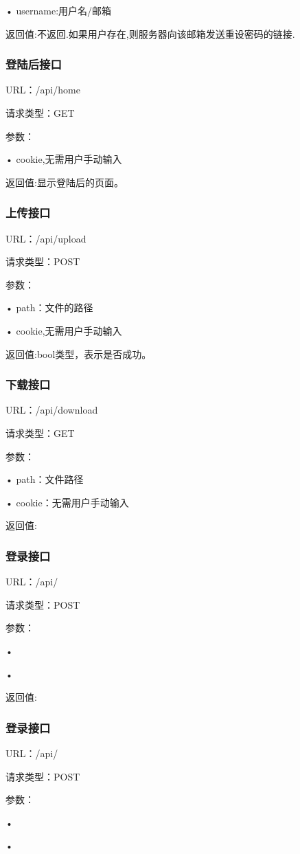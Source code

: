• username:用户名/邮箱

返回值:不返回.如果用户存在,则服务器向该邮箱发送重设密码的链接.

\subsubsection{登陆后接口}
URL：/api/home

请求类型：GET

参数：

• cookie,无需用户手动输入

返回值:显示登陆后的页面。

\subsubsection{上传接口}
URL：/api/upload

请求类型：POST

参数：

• path：文件的路径

• cookie,无需用户手动输入

返回值:bool类型，表示是否成功。

\subsubsection{下载接口}
URL：/api/download

请求类型：GET

参数：

• path：文件路径

• cookie：无需用户手动输入

返回值:

\subsubsection{登录接口}
URL：/api/

请求类型：POST

参数：

• 

• 

返回值:

\subsubsection{登录接口}
URL：/api/

请求类型：POST

参数：

• 

• 

